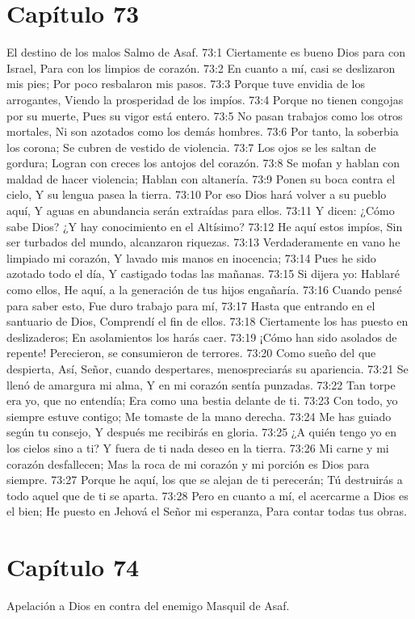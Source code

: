\section*{Capítulo 73}
El destino de los malos 
Salmo de Asaf. 
73:1 Ciertamente es bueno Dios para con Israel, 
Para con los limpios de corazón. 
73:2 En cuanto a mí, casi se deslizaron mis pies; 
Por poco resbalaron mis pasos. 
73:3 Porque tuve envidia de los arrogantes, 
Viendo la prosperidad de los impíos. 
73:4 Porque no tienen congojas por su muerte, 
Pues su vigor está entero. 
73:5 No pasan trabajos como los otros mortales, 
Ni son azotados como los demás hombres. 
73:6 Por tanto, la soberbia los corona; 
Se cubren de vestido de violencia. 
73:7 Los ojos se les saltan de gordura; 
Logran con creces los antojos del corazón. 
73:8 Se mofan y hablan con maldad de hacer violencia; 
Hablan con altanería. 
73:9 Ponen su boca contra el cielo, 
Y su lengua pasea la tierra. 
73:10 Por eso Dios hará volver a su pueblo aquí, 
Y aguas en abundancia serán extraídas para ellos. 
73:11 Y dicen: ¿Cómo sabe Dios? 
¿Y hay conocimiento en el Altísimo? 
73:12 He aquí estos impíos, 
Sin ser turbados del mundo, alcanzaron riquezas. 
73:13 Verdaderamente en vano he limpiado mi corazón, 
Y lavado mis manos en inocencia; 
73:14 Pues he sido azotado todo el día, 
Y castigado todas las mañanas. 
73:15 Si dijera yo: Hablaré como ellos, 
He aquí, a la generación de tus hijos engañaría. 
73:16 Cuando pensé para saber esto, 
Fue duro trabajo para mí, 
73:17 Hasta que entrando en el santuario de Dios, 
Comprendí el fin de ellos. 
73:18 Ciertamente los has puesto en deslizaderos; 
En asolamientos los harás caer. 
73:19 ¡Cómo han sido asolados de repente! 
Perecieron, se consumieron de terrores. 
73:20 Como sueño del que despierta, 
Así, Señor, cuando despertares, menospreciarás su apariencia. 
73:21 Se llenó de amargura mi alma, 
Y en mi corazón sentía punzadas. 
73:22 Tan torpe era yo, que no entendía; 
Era como una bestia delante de ti. 
73:23 Con todo, yo siempre estuve contigo; 
Me tomaste de la mano derecha. 
73:24 Me has guiado según tu consejo, 
Y después me recibirás en gloria. 
73:25 ¿A quién tengo yo en los cielos sino a ti? 
Y fuera de ti nada deseo en la tierra. 
73:26 Mi carne y mi corazón desfallecen; 
Mas la roca de mi corazón y mi porción es Dios para siempre. 
73:27 Porque he aquí, los que se alejan de ti perecerán; 
Tú destruirás a todo aquel que de ti se aparta. 
73:28 Pero en cuanto a mí, el acercarme a Dios es el bien; 
He puesto en Jehová el Señor mi esperanza, 
Para contar todas tus obras. 
\section*{Capítulo 74}
Apelación a Dios en contra del enemigo 
Masquil de Asaf. 
 
